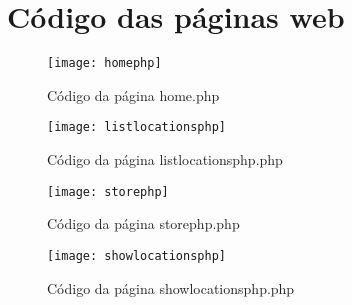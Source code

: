 \chapter{Código das páginas web}
\label{cha:codigo_do_site}

\begin{figure}[hbtp]
	\centering
	\texttt{[image: homephp]}
	\caption{Código da página home.php}
	\label{fig:homephp}
\end{figure}

\begin{figure}[hbtp]
	\centering
	\texttt{[image: listlocationsphp]}
	\caption{Código da página listlocationsphp.php}
	\label{fig:listlocationsphp}
\end{figure}

\begin{figure}[hbtp]
	\centering
	\texttt{[image: storephp]}
	\caption{Código da página storephp.php}
	\label{fig:storephp}
\end{figure}

\begin{figure}[hbtp]
	\centering
	\texttt{[image: showlocationsphp]}
	\caption{Código da página showlocationsphp.php}
	\label{fig:showlocationsphp}
\end{figure}